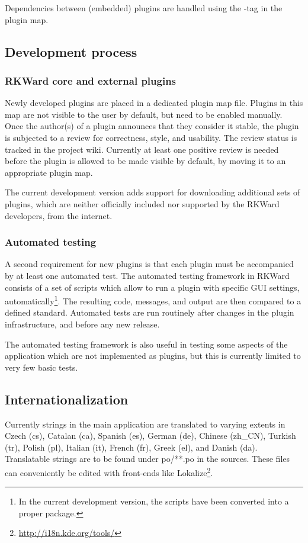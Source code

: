 Dependencies between (embedded) plugins are handled using the -tag in the plugin map.

\subsection{Development process}
\subsubsection{RKWard core and external plugins}
\label{sec:technical_processes_plugins}
Newly developed plugins are placed in a dedicated plugin map file.
Plugins in this map are not visible to the user by
default, but need to be enabled manually. Once the author(s) of a plugin
announces that they consider it stable, the plugin is subjected to a review for
correctness, style, and usability. The review status is tracked in the project
wiki. Currently at least one positive review is needed before the plugin is
allowed to be made visible by default, by moving it to an appropriate plugin
map.

The current development version adds support for downloading additional sets of
plugins, which are neither officially included nor supported by the
RKWard developers, from the internet.

\subsubsection{Automated testing}
\label{sec:technical_processes_automatedtesting}
A second requirement for new plugins is that each plugin must be accompanied by
at least one automated test. The automated testing framework in RKWard consists
of a set of  scripts which allow to run a plugin with specific GUI settings,
automatically\footnote{
  In the current development version, the scripts have been converted into a proper
   package.
}. The resulting  code,  messages, and output are then compared
to a defined standard. Automated tests are run routinely after changes in the
plugin infrastructure, and before any new release.

The automated testing framework is also useful in testing some aspects of the
application which are not implemented as plugins, but this is currently limited
to very few basic tests.

\subsection{Internationalization}
\label{sec:technical_internationalization}
Currently strings in the main application are translated to varying extents in
Czech (cs), Catalan (ca), Spanish (es), German (de), Chinese (zh\_CN), Turkish
(tr), Polish (pl), Italian (it), French (fr), Greek (el), and Danish (da).
Translatable strings are to be found under po/**.po in the sources. These files
can conveniently be edited with front-ends like Lokalize\footnote{\url{http://i18n.kde.org/tools/}}. 

